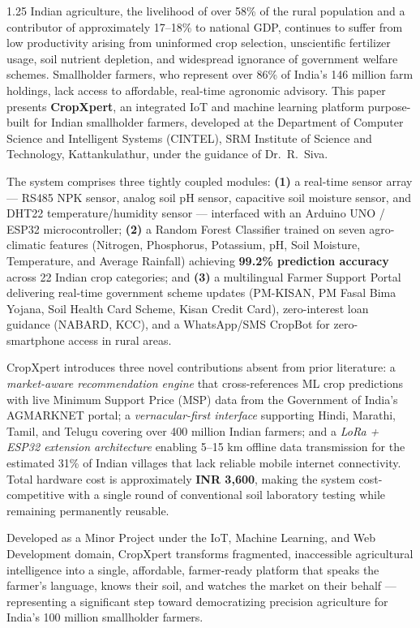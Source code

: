 \documentclass[12pt,a4paper]{article}
\begin{document}
\begin{spacing}{1.25}
\noindent
Indian agriculture, the livelihood of over 58\% of the rural population and a contributor of approximately 17--18\% to national GDP, continues to suffer from low productivity arising from uninformed crop selection, unscientific fertilizer usage, soil nutrient depletion, and widespread ignorance of government welfare schemes. Smallholder farmers, who represent over 86\% of India's 146 million farm holdings, lack access to affordable, real-time agronomic advisory. This paper presents \textbf{CropXpert}, an integrated IoT and machine learning platform purpose-built for Indian smallholder farmers, developed at the Department of Computer Science and Intelligent Systems (CINTEL), SRM Institute of Science and Technology, Kattankulathur, under the guidance of Dr.~R.~Siva.

\vspace{0.6em}
\noindent
The system comprises three tightly coupled modules: \textbf{(1)} a real-time sensor array --- RS485 NPK sensor, analog soil pH sensor, capacitive soil moisture sensor, and DHT22 temperature/humidity sensor --- interfaced with an Arduino UNO / ESP32 microcontroller; \textbf{(2)} a Random Forest Classifier trained on seven agro-climatic features (Nitrogen, Phosphorus, Potassium, pH, Soil Moisture, Temperature, and Average Rainfall) achieving \textbf{99.2\% prediction accuracy} across 22 Indian crop categories; and \textbf{(3)} a multilingual Farmer Support Portal delivering real-time government scheme updates (PM-KISAN, PM Fasal Bima Yojana, Soil Health Card Scheme, Kisan Credit Card), zero-interest loan guidance (NABARD, KCC), and a WhatsApp/SMS CropBot for zero-smartphone access in rural areas.

\vspace{0.6em}
\noindent
CropXpert introduces three novel contributions absent from prior literature: a \textit{market-aware recommendation engine} that cross-references ML crop predictions with live Minimum Support Price (MSP) data from the Government of India's AGMARKNET portal; a \textit{vernacular-first interface} supporting Hindi, Marathi, Tamil, and Telugu covering over 400 million Indian farmers; and a \textit{LoRa + ESP32 extension architecture} enabling 5--15 km offline data transmission for the estimated 31\% of Indian villages that lack reliable mobile internet connectivity. Total hardware cost is approximately \textbf{INR 3,600}, making the system cost-competitive with a single round of conventional soil laboratory testing while remaining permanently reusable.

\vspace{0.6em}
\noindent
Developed as a Minor Project under the IoT, Machine Learning, and Web Development domain, CropXpert transforms fragmented, inaccessible agricultural intelligence into a single, affordable, farmer-ready platform that speaks the farmer's language, knows their soil, and watches the market on their behalf --- representing a significant step toward democratizing precision agriculture for India's 100 million smallholder farmers.
\end{spacing}
\end{document}
